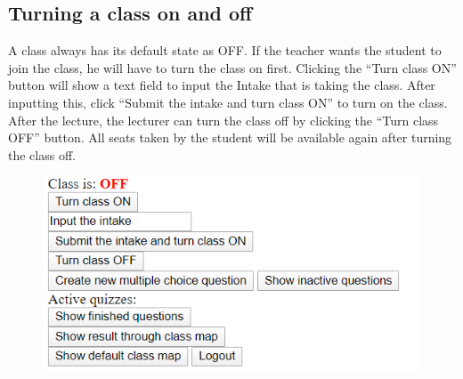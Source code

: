 \documentclass[a4paper, 11pt,openany]{book} %
\begin{document}
\subsection{Turning a class on and off}
A class always has its default state as OFF. If the teacher wants the student to join the class, he will have to turn the class on first. Clicking the “Turn class ON” button will show a text field to input the Intake that is taking the class. After inputting this, click “Submit the intake and turn class ON” to turn on the class. After the lecture, the lecturer can turn the class off by clicking the “Turn class OFF” button. All seats taken by the student will be available again after turning the class off.
\begin{figure}[H]
    \centering
    \includegraphics[width=\textwidth,height=\textheight,keepaspectratio]{images/14.png}
\end{figure}
\end{document}
